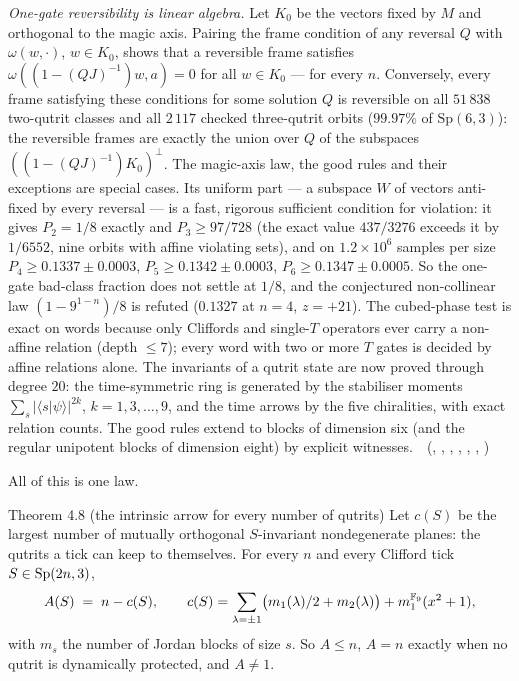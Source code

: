 \emph{One-gate reversibility is linear algebra.} Let $K_0$ be the vectors fixed by $M$ and orthogonal to the magic axis. Pairing
the frame condition of any reversal $Q$ with $\omega(w,\cdot)$, $w\in K_0$, shows that a reversible frame satisfies
$\omega((1-(QJ)^{-1})w,a)=0$ for all $w\in K_0$ --- for every $n$. Conversely, every frame satisfying these conditions for some
solution $Q$ is reversible on all $51\,838$ two-qutrit classes and all $2\,117$ checked three-qutrit orbits ($99.97\%$ of
$\mathrm{Sp}(6,3)$): the reversible frames are exactly the union over $Q$ of the subspaces $((1-(QJ)^{-1})K_0)^\perp$. The magic-axis law,
the good rules and their exceptions are special cases. Its uniform part --- a subspace $W$ of vectors anti-fixed by every
reversal --- is a fast, rigorous sufficient condition for violation: it gives $P_2=1/8$ exactly and $P_3\ge97/728$ (the exact value
$437/3276$ exceeds it by $1/6552$, nine orbits with affine violating sets), and on $1.2\times10^6$ samples per size $P_4\ge0.1337\pm0.0003$, $P_5\ge0.1342\pm0.0003$, $P_6\ge0.1347\pm0.0005$. So the
one-gate bad-class fraction does not settle at $1/8$, and the conjectured non-collinear law $(1-9^{1-n})/8$ is refuted
($0.1327$ at $n=4$, $z=+21$). The cubed-phase test is exact on words because only Cliffords and single-$T$ operators ever carry a
non-affine relation (depth $\le7$); every word with two or more $T$ gates is decided by affine relations alone. The invariants of
a qutrit state are now proved through degree $20$: the time-symmetric ring is generated by the stabiliser moments
$\sum_s|\langle s|\psi\rangle|^{2k}$, $k=1,3,\dots,9$, and the time arrows by the five chiralities, with exact relation counts. The good
rules extend to blocks of dimension six (and the regular unipotent blocks of dimension eight) by explicit witnesses.
\tierT\,\tierC\ (, ,
, , ,
, )

All of this is one law.

\begin{result}{Theorem 4.8 (the intrinsic arrow for every number of qutrits) \hfill \tierT}
Let $c(S)$ be the largest number of mutually orthogonal $S$-invariant nondegenerate planes: the qutrits a tick can
keep to themselves. For every $n$ and every Clifford tick $S\in\mathrm{Sp}(2n,3)$,
\[
A(S)\;=\;n-c(S),
\qquad
c(S)=\sum_{\lambda=\pm1}\bigl(m_1(\lambda)/2+m_2(\lambda)\bigr)+m_1^{\mathbb{F}_9}(x^2+1),
\]
with $m_s$ the number of Jordan blocks of size $s$. So $A\le n$, $A=n$ exactly when no qutrit is dynamically protected,
and $A\ne1$.
\end{result}

